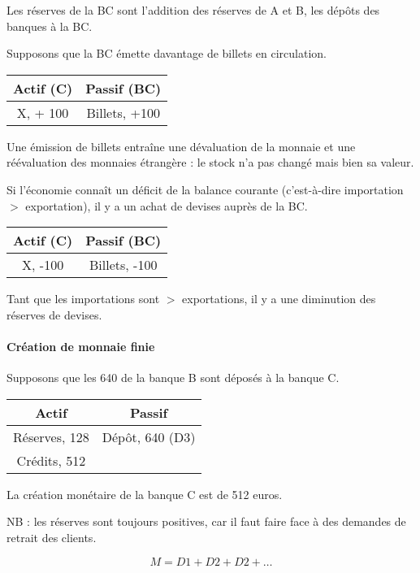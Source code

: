 	Les réserves de la BC sont l'addition des réserves de A et B, les dépôts des banques à la BC.
	
	Supposons que la BC émette davantage de billets en circulation.
	
\begin{center}
	\begin{tabular}{c|c}
	Actif (C) & Passif (BC) \\ 
	\hline 
	X, + 100 & Billets, +100 
	\end{tabular}
\end{center}
	
	Une émission de billets entraîne une dévaluation de la monnaie et une réévaluation des monnaies étrangère : le stock n'a pas changé mais bien sa valeur.
	
	Si l'économie connaît un déficit de la balance courante (c'est-à-dire importation $>$ exportation), il y a un achat de devises auprès de la BC.
	
\begin{center}
	\begin{tabular}{c|c}
	Actif (C) & Passif (BC) \\ 
	\hline 
	X, -100 & Billets, -100
	\end{tabular}
\end{center}
	
	Tant que les importations sont $>$ exportations, il y a une diminution des réserves de devises.
	
	
	\paragraph{Création de monnaie finie}
	Supposons que les 640 de la banque B sont déposés à la banque C.
	
\begin{center}
	\begin{tabular}{c|c}
	Actif & Passif \\ 
	\hline 
	Réserves, 128 & Dépôt, 640 (D3) \\ 
	Crédits, 512 &  
	\end{tabular} 
\end{center}
	
	La création monétaire de la banque C est de 512 euros.
	
	NB : les réserves sont toujours positives, car il faut faire face à des demandes de retrait des clients.
	
	$$M = D1 + D2 + D2 + \dots$$
	
